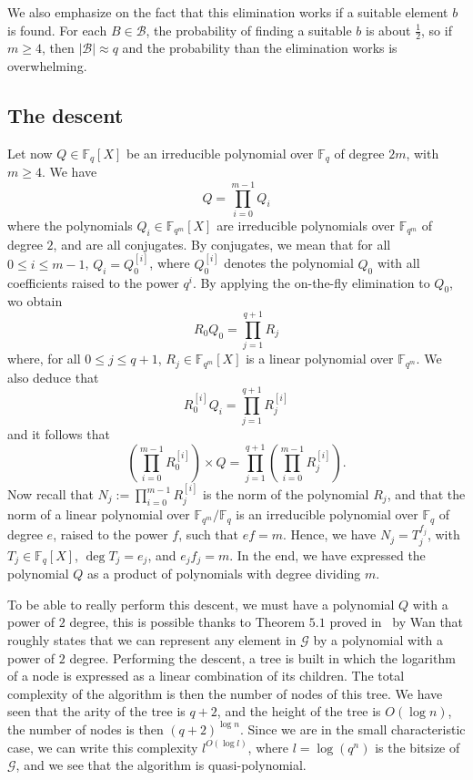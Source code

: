 \documentclass[a4paper,11pt]{article}
\theoremstyle{break}
\theoremstyle{sc}
\theoremstyle{definition}
\theoremstyle{remark}
\begin{document}
We also emphasize on the fact that this elimination works if a suitable element
$b$ is found. For each $B\in\mathcal B$, the probability of finding a suitable
$b$ is about $\frac{1}{2}$, so if
$m\geq4$, then $|\mathcal B|\approx q$ and the probability than the
elimination works is overwhelming.

\subsection{The descent}

Let now $Q\in\mathbb{F}_{q}[X]$ be an irreducible polynomial over $\mathbb{F}_{q}$ of degree
$2m$, with $m\geq4$. We have
\[
  Q = \prod_{i=0}^{m-1}Q_{i}
\]
where the polynomials $Q_i\in\mathbb{F}_{q^m}[X]$ are irreducible
polynomials over $\mathbb{F}_{q^m}$ of degree $2$, and are all
conjugates. By conjugates, we mean that for all $0\leq i\leq m-1$,
$Q_i=Q_0^{[i]}$, where $Q_0^{[i]}$ denotes the polynomial $Q_0$ with all
coefficients raised to the power $q^i$. By applying the on-the-fly
elimination to $Q_0$, wo obtain 
\[
  R_0Q_0=\prod_{j=1}^{q+1}R_j
\]
where, for all $0\leq j\leq q+1$, $R_j\in\mathbb{F}_{q^m}[X]$ is a linear
polynomial over $\mathbb{F}_{q^m}$. We also deduce that
\[
  R_{0}^{[i]}Q_i=\prod_{j=1}^{q+1}R_j^{[i]}
\]
and it follows that
\[
  (\prod_{i=0}^{m-1}R_{0}^{[i]})\times Q =
  \prod_{j=1}^{q+1}(\prod_{i=0}^{m-1}R_j^{[i]}).
\]
Now recall that $N_j:=\prod_{i=0}^{m-1}R_{j}^{[i]}$ is the norm of the
polynomial $R_j$, and that the norm of a linear polynomial over
$\mathbb{F}_{q^m}/\mathbb{F}_q$ is an irreducible polynomial over
$\mathbb{F}_q$ of degree
$e$, raised to the power $f$, such that $ef=m$. Hence, we have
$N_j=T_j^{f_j}$, with $T_j\in\mathbb{F}_{q}[X]$, $\deg T_j = e_j$, and
$e_jf_j=m$. In the end, we have expressed the polynomial $Q$ as a product of
polynomials with degree dividing $m$.

To be able to really perform this descent, we must have a polynomial $Q$ with a 
power of $2$ degree, this is possible thanks to Theorem $5.1$ proved 
in~\cite{Wan97} by Wan that roughly states that we can represent any element in
$\mathcal G$ by a polynomial with a power of $2$ degree. Performing the
descent, a tree is built in which the logarithm of a node is expressed
as a linear combination of its children. The total complexity of the algorithm
is then the number of nodes of this tree. We have seen that the arity of the
tree is $q+2$, and the height of the tree is $O(\log n)$, the number of nodes
is then $(q+2)^{\log n}$. Since we are in the small characteristic case, we
can write this complexity $l^{O(\log l)}$, where $l=\log(q^n)$ is the bitsize of
$\mathcal G$, and we see that the algorithm is quasi-polynomial.
\end{document}

